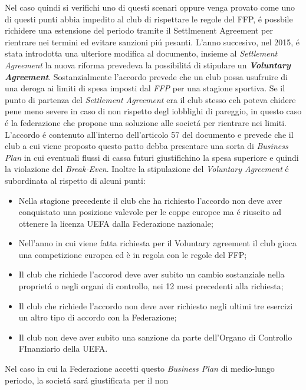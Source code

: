 \documentclass[
    corpo=12pt,
    oneside,
    evenboxes,
    tipotesi=triennale,
    stile=classica,
    oldstyle,
    autoretitolo,
    greek,
]{toptesi}
\begin{document}
\begin{interlinea}{1.5}
Nel caso quindi si verifichi uno di questi scenari oppure venga provato come uno di questi punti abbia impedito al club di rispettare le 
regole del FFP, \'e possbile richidere una estensione del periodo tramite il Settlmenent Agreement per rientrare nei termini ed evitare 
sanzioni pi\'u pesanti.\newline
L'anno succesivo, nel 2015, \'e stata introdotta una ulteriore modifica al documento, insieme al \emph{Settlement Agreement} la nuova riforma
prevedeva la possibilit\'a di stipulare un \emph{\textbf{Voluntary Agreement}}. Sostanzialmente l'accordo prevede che un club possa usufruire di una
deroga ai limiti di spesa imposti dal \emph{FFP} per una stagione sportiva. Se il punto di partenza del \emph{Settlement Agreement} era il
club stesso ceh poteva chidere pene meno severe in caso di non rispetto degl iobblighi di pareggio, in questo caso \'e la federazione che
propone una soluzione alle societ\'a per rientrare nei limiti. L'accordo \'e contenuto all'interno dell'articolo 57 del documento e prevede 
che il club a cui viene proposto questo patto debba presentare una sorta di \emph{Business Plan} in cui eventuali flussi di cassa futuri 
giustifichino la spesa superiore e quindi la violazione del \emph{Break-Even}. Inoltre la stipulazione del \emph{Voluntary Agreement} \'e
subordinata al rispetto di alcuni punti:
\begin{itemize}
    \item Nella stagione precedente il club che ha richiesto l'accordo non deve aver conquistato una posizione valevole per le coppe
    europee ma \'e riuscito ad ottenere la licenza UEFA dalla Federazione nazionale;
    \item Nell’anno in cui viene fatta richiesta per il Voluntary agreement il club gioca una competizione europea ed è in regola con
    le regole del FFP;
    \item Il club che richiede l'accorod deve aver subito un cambio sostanziale nella propriet\'a o negli organi di controllo, nei 12 mesi 
    precedenti alla richiesta;
    \item Il club che richiede l'accordo non deve aver richiesto negli ultimi tre esercizi un altro tipo di accordo con la Federazione;
    \item Il club non deve aver subito una sanzione da parte dell'Organo di Controllo FInanziario della UEFA.
\end{itemize}
Nel caso in cui la Federazione accetti questo \emph{Business Plan} di medio-lungo periodo, la societ\'a sar\'a giustificata per il non 

\end{interlinea}
\end{document}
